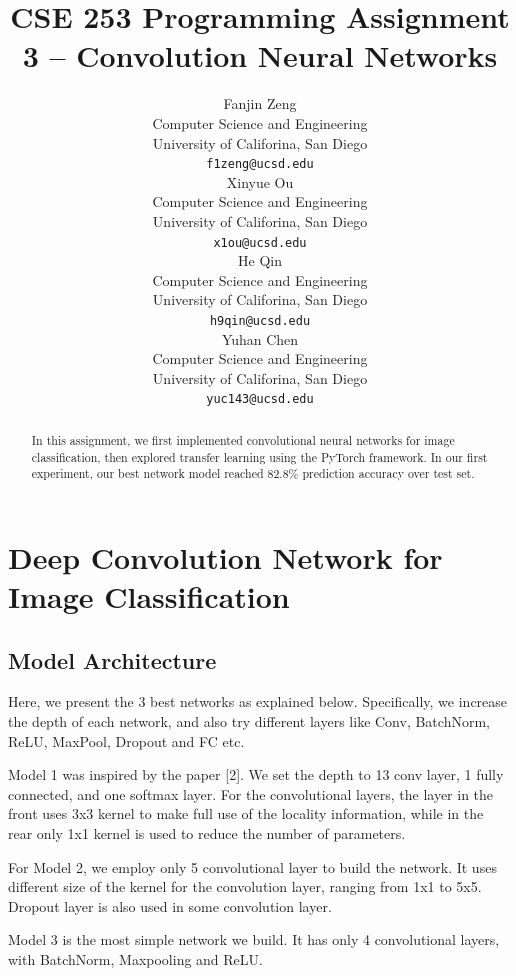 \documentclass{article}
\title{CSE 253 Programming Assignment 3 -- Convolution Neural Networks}
\author{
  Fanjin Zeng \\
  Computer Science and Engineering\\
  University of Califorina, San Diego\\
  \texttt{f1zeng@ucsd.edu} \\
   \And
   Xinyue Ou \\
   Computer Science and Engineering\\
   University of Califorina, San Diego \\
   \texttt{x1ou@ucsd.edu} \\
   \And
   He Qin \\
   Computer Science and Engineering\\
   University of Califorina, San Diego \\
   \texttt{h9qin@ucsd.edu} \\
   \And
   Yuhan Chen \\
   Computer Science and Engineering\\
   University of Califorina, San Diego \\
   \texttt{yuc143@ucsd.edu} \\
}
\begin{document}
\maketitle
\begin{abstract}
In this assignment, we first implemented convolutional neural networks for image classification, then explored transfer learning using the PyTorch framework. In our first experiment, our best network model reached 82.8\% prediction accuracy over test set. 

\end{abstract}

\section{Deep Convolution Network for Image Classification}
\subsection{Model Architecture}
Here, we present the 3 best networks as explained below. Specifically, we increase the depth of each network, and also try different layers like Conv, BatchNorm, ReLU, MaxPool, Dropout and FC etc.

Model 1 was inspired by the paper [2]. We set the depth to 13 conv layer, 1 fully connected, and one softmax layer. For the convolutional layers, the layer in the front uses 3x3 kernel to make full use of the locality information, while in the rear only 1x1 kernel is used to reduce the number of parameters.

For Model 2, we employ only 5 convolutional layer to build the network. It uses different size of the kernel for the convolution layer, ranging from 1x1 to 5x5. Dropout layer is also used in some convolution layer. 

Model 3 is the most simple network we build. It has only 4 convolutional layers, with BatchNorm, Maxpooling and ReLU.
\end{document}
